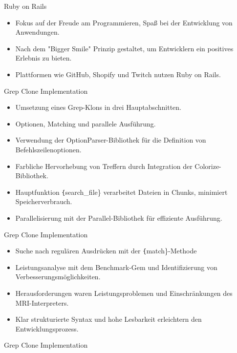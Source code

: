 \documentclass{beamer}
\begin{document}
\begin{frame}{Ruby on Rails}
  \begin{itemize}
  \item Fokus auf der Freude am Programmieren, Spaß bei der Entwicklung von Anwendungen.
    \item Nach dem "Bigger Smile" Prinzip gestaltet, um Entwicklern ein positives Erlebnis zu bieten.
    \item Plattformen wie GitHub, Shopify und Twitch nutzen Ruby on Rails.
  \end{itemize}
\end{frame}
\begin{frame}{Grep Clone Implementation}
  \begin{itemize}
    \item Umsetzung eines Grep-Klons in drei Hauptabschnitten.
    \item Optionen, Matching und parallele Ausführung.
    \item Verwendung der OptionParser-Bibliothek für die Definition von Befehlszeilenoptionen.
    \item Farbliche Hervorhebung von Treffern durch Integration der Colorize-Bibliothek.
    \item Hauptfunktion \texttt\{search\_file\} verarbeitet Dateien in Chunks, minimiert Speicherverbrauch.
    \item Parallelisierung mit der Parallel-Bibliothek für effiziente Ausführung.

   
  \end{itemize}
\end{frame}
\begin{frame}{Grep Clone Implementation}
  \begin{itemize}
    
    \item Suche nach regulären Ausdrücken mit der \texttt\{match\}-Methode
    \item Leistungsanalyse mit dem Benchmark-Gem und Identifizierung von Verbesserungsmöglichkeiten.
    \item Herausforderungen waren Leistungsproblemen und Einschränkungen des MRI-Interpreters.
  
    \item Klar strukturierte Syntax und hohe Lesbarkeit erleichtern den Entwicklungsprozess.
    
  \end{itemize}
\end{frame}
\begin{frame}{Grep Clone Implementation}
\vspace{-\topsep}


  
\end{frame}
\end{document}
